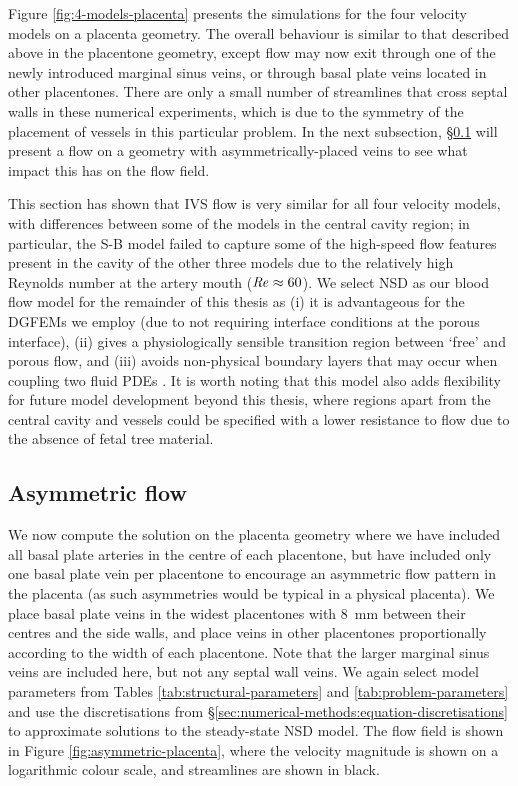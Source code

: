             Figure \ref{fig:4-models-placenta} presents the simulations for the four velocity models on a placenta geometry. The overall behaviour is similar to that described above in the placentone geometry, except flow may now exit through one of the newly introduced marginal sinus veins, or through basal plate veins located in other placentones. There are only a small number of streamlines that cross septal walls in these numerical experiments, which is due to the symmetry of the placement of vessels in this particular problem. In the next subsection, \S\ref{sec:numerical-methods:blood-flow-experiments:asymmetric} will present a flow on a geometry with asymmetrically-placed veins to see what impact this has on the flow field.

            This section has shown that IVS flow is very similar for all four velocity models, with differences between some of the models in the central cavity region; in particular, the S-B model failed to capture some of the high-speed flow features present in the cavity of the other three models due to the relatively high Reynolds number at the artery mouth ($\operatorname{\mbox{\textit{Re}}} \approx 60$). We select NSD as our blood flow model for the remainder of this thesis as (i) it is advantageous for the DGFEMs we employ (due to not requiring interface conditions at the porous interface), (ii) gives a physiologically sensible transition region between `free' and porous flow, and (iii) avoids non-physical boundary layers that may occur when coupling two fluid PDEs \cite{nealePracticalSignificanceBrinkman1974}. It is worth noting that this model also adds flexibility for future model development beyond this thesis, where regions apart from the central cavity and vessels could be specified with a lower resistance to flow due to the absence of fetal tree material.
    
        \subsection{Asymmetric flow} \label{sec:numerical-methods:blood-flow-experiments:asymmetric}
            We now compute the solution on the placenta geometry where we have included all basal plate arteries in the centre of each placentone, but have included only one basal plate vein per placentone to encourage an asymmetric flow pattern in the placenta (as such asymmetries would be typical in a physical placenta). We place basal plate veins in the widest placentones with \qty{8}{\milli\metre} between their centres and the side walls, and place veins in other placentones proportionally according to the width of each placentone. Note that the larger marginal sinus veins are included here, but not any septal wall veins. We again select model parameters from Tables \ref{tab:structural-parameters} and \ref{tab:problem-parameters} and use the discretisations from \S\ref{sec:numerical-methods:equation-discretisations} to approximate solutions to the steady-state NSD model. The flow field is shown in Figure \ref{fig:asymmetric-placenta}, where the velocity magnitude is shown on a logarithmic colour scale, and streamlines are shown in black.

